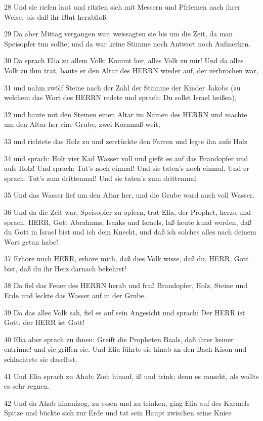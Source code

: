 \par 28 Und sie riefen laut und ritzten sich mit Messern und Pfriemen nach ihrer Weise, bis daß ihr Blut herabfloß.
\par 29 Da aber Mittag vergangen war, weissagten sie bis um die Zeit, da man Speisopfer tun sollte; und da war keine Stimme noch Antwort noch Aufmerken.
\par 30 Da sprach Elia zu allem Volk: Kommt her, alles Volk zu mir! Und da alles Volk zu ihm trat, baute er den Altar des HERRN wieder auf, der zerbrochen war,
\par 31 und nahm zwölf Steine nach der Zahl der Stämme der Kinder Jakobs (zu welchem das Wort des HERRN redete und sprach: Du sollst Israel heißen),
\par 32 und baute mit den Steinen einen Altar im Namen des HERRN und machte um den Altar her eine Grube, zwei Kornmaß weit,
\par 33 und richtete das Holz zu und zerstückte den Farren und legte ihn aufs Holz
\par 34 und sprach: Holt vier Kad Wasser voll und gießt es auf das Brandopfer und aufs Holz! Und sprach: Tut's noch einmal! Und sie taten's noch einmal. Und er sprach: Tut's zum drittenmal! Und sie taten's zum drittenmal.
\par 35 Und das Wasser lief um den Altar her, und die Grube ward auch voll Wasser.
\par 36 Und da die Zeit war, Speisopfer zu opfern, trat Elia, der Prophet, herzu und sprach: HERR, Gott Abrahams, Isaaks und Israels, laß heute kund werden, daß du Gott in Israel bist und ich dein Knecht, und daß ich solches alles nach deinem Wort getan habe!
\par 37 Erhöre mich HERR, erhöre mich, daß dies Volk wisse, daß du, HERR, Gott bist, daß du ihr Herz darnach bekehrst!
\par 38 Da fiel das Feuer des HERRN herab und fraß Brandopfer, Holz, Steine und Erde und leckte das Wasser auf in der Grube.
\par 39 Da das alles Volk sah, fiel es auf sein Angesicht und sprach: Der HERR ist Gott, der HERR ist Gott!
\par 40 Elia aber sprach zu ihnen: Greift die Propheten Baals, daß ihrer keiner entrinne! und sie griffen sie. Und Elia führte sie hinab an den Bach Kison und schlachtete sie daselbst.
\par 41 Und Elia sprach zu Ahab: Zieh hinauf, iß und trink; denn es rauscht, als wollte es sehr regnen.
\par 42 Und da Ahab hinaufzog, zu essen und zu trinken, ging Elia auf des Karmels Spitze und bückte sich zur Erde und tat sein Haupt zwischen seine Kniee
